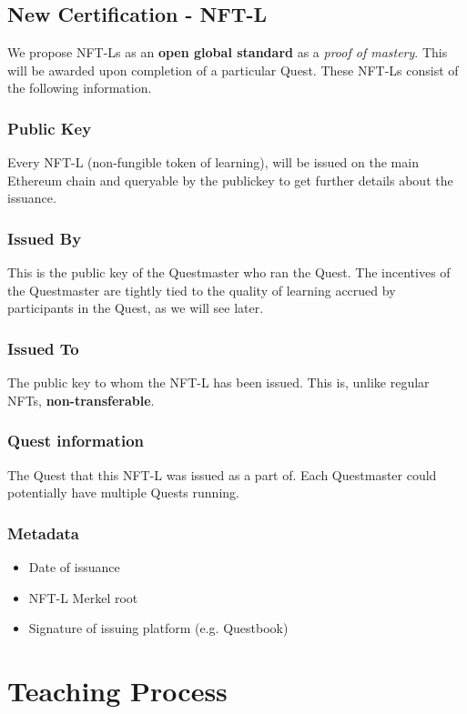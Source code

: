 \documentclass{article}
\begin{document}
    \subsection{New Certification - NFT-L}
      We propose NFT-Ls as an \textbf{open global standard} as a \textit{proof of mastery}. This will be awarded upon completion of a particular Quest. These NFT-Ls consist of the following information.
      \subsubsection{Public Key}
        Every NFT-L (non-fungible token of learning), will be issued on the main Ethereum chain and queryable by the publickey to get further details about the issuance.
      \subsubsection{Issued By}
        This is the public key of the Questmaster who ran the Quest. The incentives of the Questmaster are tightly tied to the quality of learning accrued by participants in the Quest, as we will see later. 
      \subsubsection{Issued To}
        The public key to whom the NFT-L has been issued. This is, unlike regular NFTs, \textbf{non-transferable}. 
      \subsubsection{Quest information}
        The Quest that this NFT-L was issued as a part of. Each Questmaster could potentially have multiple Quests running. 
      \subsubsection{Metadata}
        \begin{itemize}
          \item Date of issuance
          \item NFT-L Merkel root
          \item Signature of issuing platform (e.g. Questbook)
        \end{itemize}
      
  \section{Teaching Process}
\end{document}

